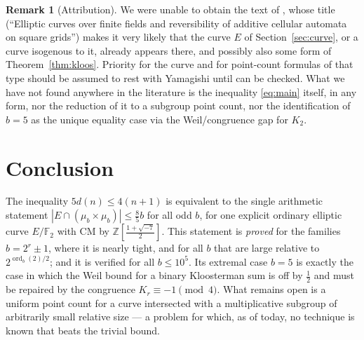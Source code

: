\documentclass[a4paper]{article}
\theoremstyle{definition}
\newtheorem{remark}[theorem]{Remark}
\newcommand{\Z}{\mathbb{Z}}
\newcommand{\F}{\mathbb{F}}
\newcommand{\abs}[1]{\left| #1 \right|}
\begin{document}
	\begin{remark}[Attribution]
		We were unable to obtain the text of \cite{YAMAGISHI2013}, whose title (``Elliptic curves over finite fields and reversibility of additive cellular automata on square grids'') makes it very likely that the curve $E$ of Section~\ref{sec:curve}, or a curve isogenous to it, already appears there, and possibly also some form of Theorem~\ref{thm:kloos}.
		Priority for the curve and for point-count formulas of that type should be assumed to rest with Yamagishi until \cite{YAMAGISHI2013} can be checked.
		What we have not found anywhere in the literature is the inequality \eqref{eq:main} itself, in any form, nor the reduction of it to a subgroup point count, nor the identification of $b = 5$ as the unique equality case via the Weil/congruence gap for $K_2$.
	\end{remark}

	\section{Conclusion}
	The inequality $5d(n) \le 4(n+1)$ is equivalent to the single arithmetic statement $\abs{E \cap (\mu_b \times \mu_b)} \le \frac85 b$ for all odd $b$, for one explicit ordinary elliptic curve $E/\F_2$ with CM by $\Z[\frac{1+\sqrt{-7}}{2}]$.
	This statement is \emph{proved} for the families $b = 2^r \pm 1$, where it is nearly tight, and for all $b$ that are large relative to $2^{\operatorname{ord}_b(2)/2}$; and it is verified for all $b \leq 10^5$.
	Its extremal case $b = 5$ is exactly the case in which the Weil bound for a binary Kloosterman sum is off by $\frac12$ and must be repaired by the congruence $K_r \equiv -1 \pmod 4$.
	What remains open is a uniform point count for a curve intersected with a multiplicative subgroup of arbitrarily small relative size --- a problem for which, as of today, no technique is known that beats the trivial bound.

	
	
\end{document}
